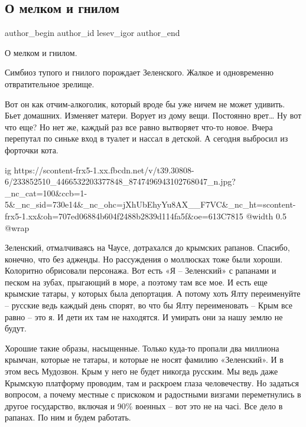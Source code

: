  
 
 
 
 
 
\subsection{О мелком и гнилом}
\label{sec:06_08_2021.fb.lesev_igor.1.melkoje_gniloje_zelenskii}
 
\ifcmt
 author_begin
   author_id lesev_igor
 author_end
\fi

О мелком и гнилом.

Симбиоз тупого и гнилого порождает Зеленского. Жалкое и одновременно отвратительное зрелище.

Вот он как отчим-алкоголик, который вроде бы уже ничем не может удивить. Бьет
домашних. Изменяет матери. Ворует из дому вещи. Постоянно врет… Ну вот что еще?
Но нет же, каждый раз все равно вытворяет что-то новое. Вчера перепутал по
синьке вход в туалет и нассал в детской. А сегодня выбросил из форточки кота.

\ifcmt
  ig https://scontent-frx5-1.xx.fbcdn.net/v/t39.30808-6/233852510_4466532203377848_8747496943102768047_n.jpg?_nc_cat=100&ccb=1-5&_nc_sid=730e14&_nc_ohc=jXhUbEhyYu8AX__F7VC&_nc_ht=scontent-frx5-1.xx&oh=707ed06884b604f2488b2839d114fa5f&oe=613C7815
  @width 0.5
  @wrap \parpic[r]
\fi

Зеленский, отмалчиваясь на Чаусе, дотрахался до крымских рапанов. Спасибо,
конечно, что без адженды. Но рассуждения о моллюсках тоже были хороши.
Колоритно обрисовали персонажа. Вот есть «Я – Зеленский» с рапанами и песком на
зубах, прыгающий в море, а поэтому там все мое. И есть еще крымские татары, у
которых была депортация. А потому хоть Ялту переименуйте – русские ведь каждый
день спорят, во что бы Ялту переименовать – Крым все равно – это я. И дети их
там не находятся. И умирать они за нашу землю не будут.

Хорошие такие образы, насыщенные. Только куда-то пропали два миллиона крымчан,
которые не татары, и которые не носят фамилию «Зеленский». И в этом весь
Мудозвон. Крым у него не будет никогда русским. Мы ведь даже Крымскую платформу
проводим, там и раскроем глаза человечеству. Но задаться вопросом, а почему
местные с прискоком и радостными визгами переметнулись в другое государство,
включая и 90\% военных – вот это не на часі. Все дело в рапанах. По ним и будем
работать.

